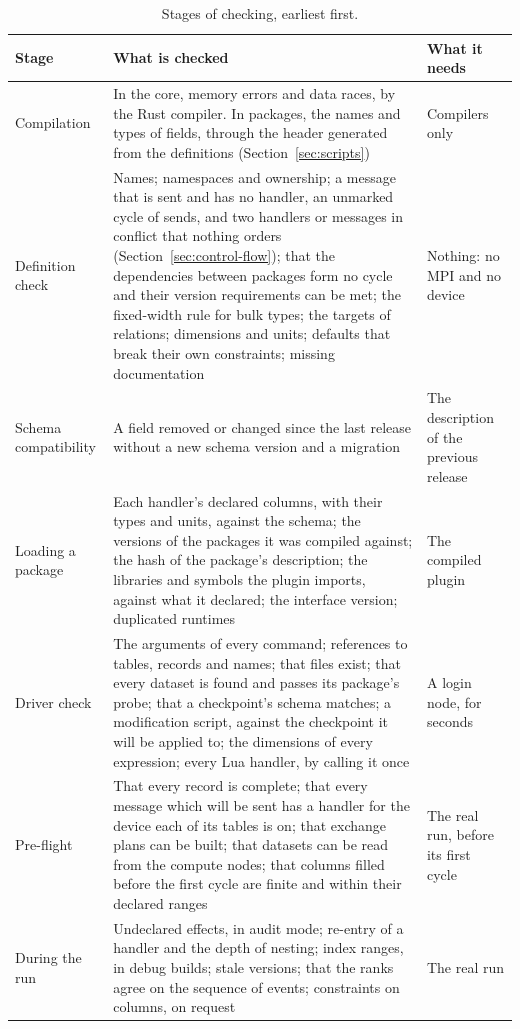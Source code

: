 \documentclass[11pt,a4paper]{article}
\begin{document}
\begin{table}[ht]
\centering
\small
\begin{tabularx}{\textwidth}{@{}>{\raggedright\arraybackslash}p{30mm} L >{\raggedright\arraybackslash}p{30mm}@{}}
\toprule
Stage & What is checked & What it needs \\
\midrule
Compilation & In the core, memory errors and data races, by the Rust compiler.  In packages, the names and types of fields, through the header generated from the definitions (Section~\ref{sec:scripts}) & Compilers only \\
Definition check & Names; namespaces and ownership; a message that is sent and has no handler, an unmarked cycle of sends, and two handlers or messages in conflict that nothing orders (Section~\ref{sec:control-flow}); that the dependencies between packages form no cycle and their version requirements can be met; the fixed-width rule for bulk types; the targets of relations; dimensions and units; defaults that break their own constraints; missing documentation & Nothing: no MPI and no device \\
Schema compatibility & A field removed or changed since the last release without a new schema version and a migration & The description of the previous release \\
Loading a package & Each handler's declared columns, with their types and units, against the schema; the versions of the packages it was compiled against; the hash of the package's description; the libraries and symbols the plugin imports, against what it declared; the interface version; duplicated runtimes & The compiled plugin \\
Driver check & The arguments of every command; references to tables, records and names; that files exist; that every dataset is found and passes its package's probe; that a checkpoint's schema matches; a modification script, against the checkpoint it will be applied to; the dimensions of every expression; every Lua handler, by calling it once & A login node, for seconds \\
Pre-flight & That every record is complete; that every message which will be sent has a handler for the device each of its tables is on; that exchange plans can be built; that datasets can be read from the compute nodes; that columns filled before the first cycle are finite and within their declared ranges & The real run, before its first cycle \\
During the run & Undeclared effects, in audit mode; re-entry of a handler and the depth of nesting; index ranges, in debug builds; stale versions; that the ranks agree on the sequence of events; constraints on columns, on request & The real run \\
\bottomrule
\end{tabularx}
\caption{Stages of checking, earliest first.}
\label{tab:stages}
\end{table}
\end{document}

